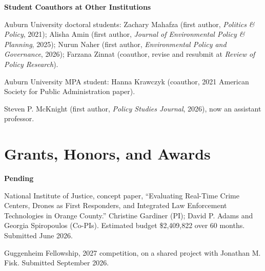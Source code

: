 \documentclass[11pt,letterpaper]{article}
\renewenvironment{itemize}{
  \begin{list}{}{
    \setlength{\leftmargin}{1.5em}
    \setlength{\itemsep}{0.25em}
    \setlength{\parskip}{0pt}
    \setlength{\parsep}{0.25em}
  }
}{
  \end{list}
}
\begin{document}
\textbf{Student Coauthors at Other Institutions}
\begin{itemize}\leftmargin=2pt\itemindent=-15pt
  \item Auburn University doctoral students: Zachary Mahafza (first author, \emph{Politics \& Policy}, 2021); Alisha Amin (first author, \emph{Journal of Environmental Policy \& Planning}, 2025); Nurun Naher (first author, \emph{Environmental Policy and Governance}, 2026); Farzana Zinnat (coauthor, revise and resubmit at \emph{Review of Policy Research}).
  \item Auburn University MPA student: Hanna Krawczyk (coauthor, 2021 American Society for Public Administration paper).
  \item Steven P. McKnight (first author, \emph{Policy Studies Journal}, 2026), now an assistant professor.
\end{itemize}

\section*{Grants, Honors, and Awards}
\textbf{Pending}
\begin{itemize}\leftmargin=2pt\itemindent=-15pt
  \item National Institute of Justice, concept paper, ``Evaluating Real-Time Crime Centers, Drones as First Responders, and Integrated Law Enforcement Technologies in Orange County.'' Christine Gardiner (PI); David P. Adams and Georgia Spiropoulos (Co-PIs). Estimated budget \$2,409,822 over 60 months. Submitted June 2026.
  \item Guggenheim Fellowship, 2027 competition, on a shared project with Jonathan M. Fisk. Submitted September 2026.
\end{itemize}
\end{document}
